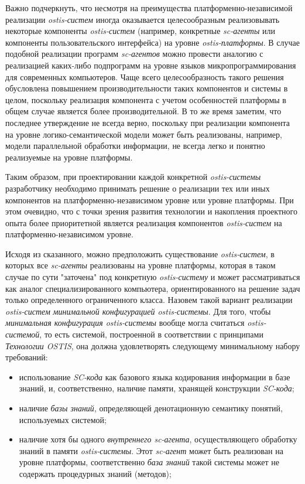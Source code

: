 Важно подчеркнуть, что несмотря на преимущества платформенно-независимой реализации \textit{ostis-систем} иногда оказывается целесообразным реализовывать некоторые компоненты \textit{ostis-систем} (например, конкретные \textit{sc-агенты} или компоненты пользовательского интерфейса) на уровне \textit{ostis-платформы}. В случае подобной реализации программ \textit{sc-агентов} можно провести аналогию с реализацией каких-либо подпрограмм на уровне языков микропрограммирования для современных компьютеров. Чаще всего целесообразность такого решения обусловлена повышением производительности таких компонентов и системы в целом, поскольку реализация компонента с учетом особенностей платформы в общем случае является более производительной. В то же время заметим, что последнее утверждение не всегда верно, поскольку при реализации компонента на уровне логико-семантической модели может быть реализованы, например, модели параллельной обработки информации, не всегда легко и понятно реализуемые на уровне платформы.

Таким образом, при проектировании каждой конкретной \textit{ostis-системы} разработчику необходимо принимать решение о реализации тех или иных компонентов на платформенно-независимом уровне или уровне платформы. При этом очевидно, что с точки зрения развития технологии и накопления проектного опыта более приоритетной является реализация компонентов \textit{ostis-систем} на платформенно-независимом уровне.

Исходя из сказанного, можно предположить существование \textit{ostis-систем}, в которых все \textit{sc-агенты} реализованы на уровне платформы, которая в таком случае по сути "заточена"{} под конкретную \textit{ostis-систему} и может рассматриваться как аналог специализированного компьютера, ориентированного на решение задач только определенного ограниченного класса. Назовем такой вариант реализации \textit{ostis-систем} \textit{минимальной конфигурацией ostis-системы}. Для того, чтобы \textit{минимальная конфигурация ostis-системы} вообще могла считаться \textit{ostis-системой}, то есть системой, построенной в соответствии с принципами \textit{Технологии OSTIS}, она должна удовлетворять следующему минимальному набору требований:
\begin{itemize}
	\item использование \textit{SC-кода} как базового языка кодирования информации в базе знаний, и, соответственно, наличие памяти, хранящей конструкции \textit{SC-кода};
	\item наличие \textit{базы знаний}, определяющей денотационную семантику понятий, используемых системой;
	\item наличие хотя бы одного \textit{внутреннего sc-агента}, осуществляющего обработку знаний в памяти \textit{ostis-системы}. Этот \textit{sc-агент} может быть реализован на уровне платформы, соответственно \textit{база знаний} такой системы может не содержать процедурных знаний (методов);
\end{itemize}

